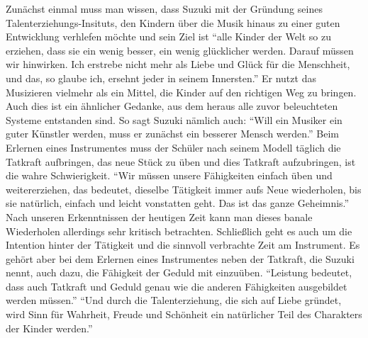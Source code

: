 Zunächst einmal muss man wissen, dass Suzuki mit der Gründung seines
Talenterziehungs-Insituts, den Kindern über die Musik hinaus zu einer guten
Entwicklung verhlefen möchte und sein Ziel ist \enquote{alle Kinder der Welt so zu erziehen, dass sie
ein wenig besser, ein wenig glücklicher werden. Darauf müssen wir hinwirken. Ich
erstrebe nicht mehr als Liebe und Glück für die Menschheit, und das, so glaube
ich, ersehnt jeder in seinem Innersten.}
\autocite[103]{suzuki:erziehung_ist_liebe}
Er nutzt das Musizieren vielmehr als ein Mittel, die Kinder auf den richtigen
Weg zu bringen. Auch dies ist ein ähnlicher Gedanke, aus dem heraus alle zuvor
beleuchteten Systeme entstanden sind. So sagt Suzuki nämlich auch: \enquote{Will ein Musiker ein guter
Künstler werden, muss er zunächst ein besserer Mensch
werden.}\autocite[103]{suzuki:erziehung_ist_liebe} Beim Erlernen eines
Instrumentes muss der Schüler nach seinem Modell täglich die Tatkraft
aufbringen, das neue Stück zu üben und dies Tatkraft aufzubringen, ist die wahre
Schwierigkeit. %
\enquote{Wir müssen unsere Fähigkeiten einfach üben und
weitererziehen, das bedeutet, dieselbe Tätigkeit immer aufs Neue wiederholen,
bis sie natürlich, einfach und leicht vonstatten geht. Das ist das ganze
Geheimnis.}\autocite[57]{suzuki:erziehung_ist_liebe} Nach unseren Erkenntnissen der heutigen Zeit kann man
dieses banale Wiederholen allerdings sehr kritisch betrachten. Schließlich geht
es auch um die Intention hinter der Tätigkeit und die sinnvoll verbrachte Zeit
am Instrument. Es gehört aber bei dem
Erlernen eines Instrumentes neben der Tatkraft, die Suzuki nennt, auch dazu, die
Fähigkeit der Geduld mit einzuüben. \enquote{Leistung bedeutet, dass auch Tatkraft und
Geduld genau wie die anderen Fähigkeiten ausgebildet werden müssen.}
\autocite[60]{suzuki:erziehung_ist_liebe}
\enquote{Und durch die Talenterziehung, die sich auf Liebe gründet, wird Sinn für
Wahrheit, Freude und Schönheit ein natürlicher Teil des Charakters der Kinder
werden.} \autocite[75]{suzuki:erziehung_ist_liebe}

